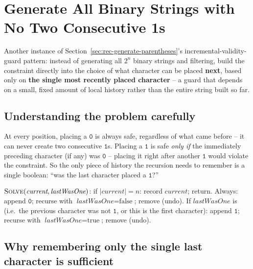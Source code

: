 \section{Generate All Binary Strings with No Two Consecutive 1s}
\label{sec:rec-generate-binary-strings}


\begin{patternbox}
Another instance of Section~\ref{sec:rec-generate-parentheses}'s
incremental-validity-guard pattern: instead of generating all $2^n$
binary strings and filtering, build the constraint directly into the
choice of what character can be placed \textbf{next}, based only on
\textbf{the single most recently placed character} -- a guard that
depends on a small, fixed amount of local history rather than the entire
string built so far.
\end{patternbox}

\subsection*{Understanding the problem carefully}

At every position, placing a $\texttt{0}$ is always safe, regardless of
what came before -- it can never create two consecutive $\texttt{1}$s.
Placing a $\texttt{1}$ is safe \emph{only if} the immediately preceding
character (if any) was $\texttt{0}$ -- placing it right after another
$\texttt{1}$ would violate the constraint. So the only piece of history
the recursion needs to remember is a single boolean: ``was the last
character placed a $\texttt{1}$?''

\begin{ideabox}
$\textsc{Solve}(\textit{current}, \textit{lastWasOne})$: if
$|\textit{current}|=n$: record $\textit{current}$; return. Always:
append $\texttt{0}$; recurse with $\textit{lastWasOne}=\text{false}$;
remove (undo). If $\textit{lastWasOne}$ is  (i.e.\ the
previous character was not $\texttt{1}$, or this is the first
character): append $\texttt{1}$; recurse with
$\textit{lastWasOne}=\text{true}$; remove (undo).
\end{ideabox}

\subsection*{Why remembering only the single last character is sufficient}

